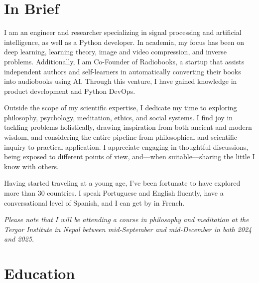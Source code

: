 \documentclass[a4paper,11pt]{article}
\newcommand{\sectionBioNonTech}{
      Outside the scope of my scientific expertise, I dedicate my time to exploring philosophy, psychology, meditation, ethics, and social systems. I find joy in tackling problems holistically, drawing inspiration from both ancient and modern wisdom, and considering the entire pipeline from philosophical and scientific inquiry to practical application. I appreciate engaging in thoughtful discussions, being exposed to different points of view, and—when suitable—sharing the little I know with others.

      Having started traveling at a young age, I've been fortunate to have explored more than 30 countries. I speak Portuguese and English fluently, have a conversational level of Spanish, and I can get by in French.
    }
\newcommand{\sectionBioNonTech}{
      \vspace{10pt}
      Highlights: \\[-20pt]
      \begin{itemize}[topsep=0pt, partopsep=0pt, parsep=0pt, itemsep=0pt, leftmargin=*]
        \item \href{https://www.joaquimcampos.com/pubs.html}{7 publications} with over 300 citations in top-tier venues, and 3 patents.
        \item Contributed to the development of \href{https://www.joaquimcampos.com/compression.html}{pioneering methods} in neural compression.
        \item Crafted \href{https://www.joaquimcampos.com/deepsplines.html}{novel algorithms} for
        learning the activation functions of a neural network.
        \item Created the \href{https://pypi.org/project/deepsplines/}{"Deep Splines"} PyTorch package.
        \item Co-Founded \href{https://radiobooks.webflow.io/}{Radiobooks}—a startup that makes AI text-to-speech technology.
        \item Built the \href{https://github.com/joaquimcampos/radiobooks-sample}{back-end} of a complex text-to-speech app.
      \end{itemize}
    }
\begin{document}

  \vspace{15pt}

  \section{In Brief}
    I am an engineer and researcher specializing in signal processing and artificial intelligence, as well as a Python developer. In academia, my focus has been on deep learning, learning theory, image and video compression, and inverse problems. Additionally, I am Co-Founder of Radiobooks, a startup that assists independent authors and self-learners in automatically converting their books into audiobooks using AI. Through this venture, I have gained knowledge in product development and Python DevOps.

    \sectionBioNonTech

    \vspace{4pt}

    \emph{Please note that I will be attending a course in philosophy and meditation at the Tergar Institute in Nepal between mid-September and mid-December in both 2024 and 2025.
    }

  \vspace{15pt}

  \section{Education}
\end{document}
